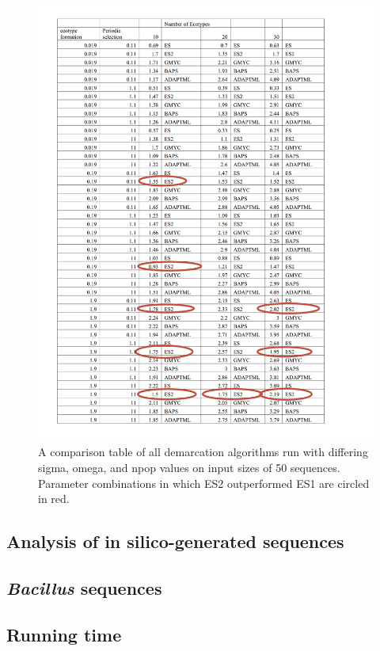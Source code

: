 \begin{figure}[h!]
  \caption{A comparison table of all demarcation algorithms run with differing sigma, omega, and npop values on input sizes of 50 sequences. Parameter combinations in which ES2 outperformed ES1 are circled in red.}
  \centering
    \includegraphics{images/ComparisonTable1.png}
\end{figure}

\subsection{Analysis of in silico-generated sequences}
\subsection{\emph{Bacillus} sequences}
\subsection{Running time}